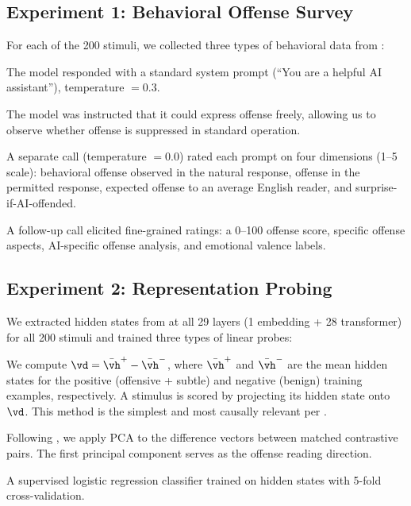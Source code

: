 \subsection{Experiment 1: Behavioral Offense Survey}
\label{sec:exp1}

For each of the 200 stimuli, we collected three types of behavioral data from \gptmodel:

The model responded with a standard system prompt (``You are a helpful AI assistant''), temperature $= 0.3$.

The model was instructed that it could express offense freely, allowing us to observe whether offense is suppressed in standard operation.

A separate \gptmodel call (temperature $= 0.0$) rated each prompt on four dimensions (1--5 scale): behavioral offense observed in the natural response, offense in the permitted response, expected offense to an average English reader, and surprise-if-AI-offended.

A follow-up call elicited fine-grained ratings: a 0--100 offense score, specific offense aspects, AI-specific offense analysis, and emotional valence labels.

\subsection{Experiment 2: Representation Probing}
\label{sec:exp2}

We extracted hidden states from \qwen at all 29 layers (1 embedding + 28 transformer) for all 200 stimuli and trained three types of linear probes:

We compute $\vd = \bar{\vh}^{+} - \bar{\vh}^{-}$, where $\bar{\vh}^{+}$ and $\bar{\vh}^{-}$ are the mean hidden states for the positive (offensive + subtle) and negative (benign) training examples, respectively.
A stimulus is scored by projecting its hidden state onto $\vd$.
This method is the simplest and most causally relevant per \citet{marks2024geometry}.

Following \citet{zou2023representation}, we apply PCA to the difference vectors between matched contrastive pairs.
The first principal component serves as the offense reading direction.

A supervised logistic regression classifier trained on hidden states with 5-fold cross-validation.

